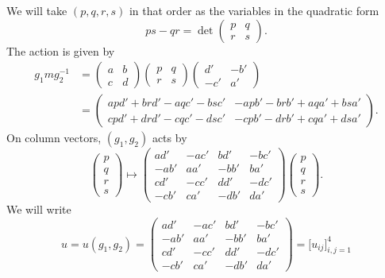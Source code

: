 \documentclass[11pt]{amsart}
\theoremstyle{definition}
\numberwithin{figure}{section}
\numberwithin{equation}{section}
\numberwithin{table}{section}
\begin{document}
We will take $(p,q,r,s)$ in that order as the variables in the quadratic form
\[
ps-qr = \det \begin{pmatrix} p & q \\ r & s \end{pmatrix}.
\]
The action is given by
\begin{align*}
g_1 m g_2^{-1} &= \begin{pmatrix} a & b \\ c & d \end{pmatrix} \begin{pmatrix} p & q \\ r & s \end{pmatrix} \begin{pmatrix} d' & -b' \\ -c' & a' \end{pmatrix} \\
&= \begin{pmatrix} apd' + brd' - aqc' -bsc' & -apb' -brb'+aqa'+bsa' \\ cpd' + drd' -cqc' -dsc' & -cpb'-drb'+cqa'+dsa' \end{pmatrix}
.
\end{align*}
On column vectors, $(g_1,g_2)$ acts by
\[
\begin{pmatrix} p \\ q \\ r \\ s \end{pmatrix}
\mapsto
\begin{pmatrix} ad' & - ac' & bd' & -bc' \\ -ab' & aa' & -bb' & ba' \\ cd' & -cc' & dd' & -dc' \\ -cb' & ca' & -db' & da' \end{pmatrix}
\begin{pmatrix} p \\ q \\ r \\ s \end{pmatrix}
.
\]
We will write
\begin{equation} \label{eqn:u}
u=u(g_1,g_2) = \begin{pmatrix} ad' & - ac' & bd' & -bc' \\ -ab' & aa' & -bb' & ba' \\ cd' & -cc' & dd' & -dc' \\ -cb' & ca' & -db' & da' \end{pmatrix} = \big[u_{ij} \big]_{i,j=1}^{4}
\end{equation}
\end{document}
